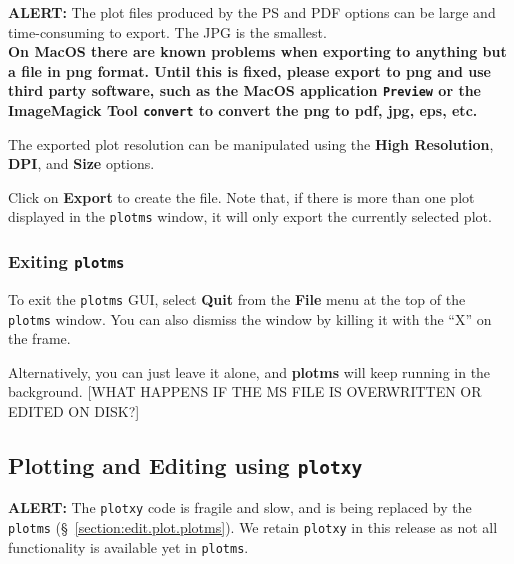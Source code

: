 {\bf ALERT:} The plot files produced by the PS and PDF options can be
large and time-consuming to export.  The JPG is the smallest.\\ 
{\bf On
  MacOS there are known problems when exporting to anything but a file
  in png
  format. Until this is fixed, please export to png and use third
  party software, such as the MacOS
  application {\tt Preview} or the ImageMagick Tool {\tt convert} to
  convert the png to pdf, jpg, eps, etc. }

The exported plot resolution can be manipulated using the {\bf High Resolution}, {\bf DPI}, and {\bf Size} options.

Click on {\bf Export} to create the file. Note that, if there is more
than one plot displayed in the {\tt plotms} window,
it will only export the currently selected plot.

\subsubsection{Exiting {\tt plotms}}
\label{section:edit.plot.plotms.exit}

To exit the {\tt plotms} GUI, select {\bf Quit} from the {\bf File} menu at the top of the {\tt plotms} window. You can also dismiss the window by killing it with the ``X'' on the frame.

Alternatively, you can just leave it alone, and {\bf plotms} will keep running in the background. [WHAT HAPPENS IF THE MS FILE IS OVERWRITTEN OR EDITED ON DISK?]








\subsection{Plotting and Editing using {\tt plotxy}}
\label{section:edit.plot.plotxy}



{\bf ALERT:} The {\tt plotxy} code is fragile and slow, and is being replaced by the {\tt plotms} (\S~\ref{section:edit.plot.plotms}). We retain {\tt plotxy} in this release as not all functionality is available yet in {\tt plotms}.


